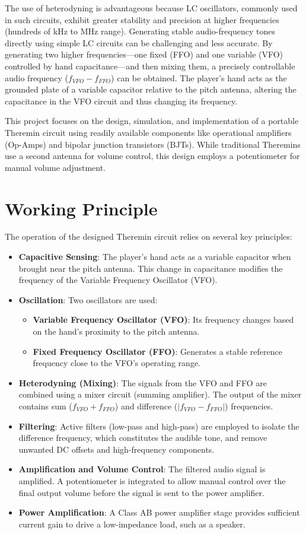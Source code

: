 \documentclass[conference]{IEEEtran}
\begin{document}
The use of heterodyning is advantageous because LC oscillators, commonly used in such circuits, exhibit greater stability and precision at higher frequencies (hundreds of kHz to MHz range). Generating stable audio-frequency tones directly using simple LC circuits can be challenging and less accurate. By generating two higher frequencies—one fixed (FFO) and one variable (VFO) controlled by hand capacitance—and then mixing them, a precisely controllable audio frequency ($f_{VFO} - f_{FFO}$) can be obtained. The player's hand acts as the grounded plate of a variable capacitor relative to the pitch antenna, altering the capacitance in the VFO circuit and thus changing its frequency.

This project focuses on the design, simulation, and implementation of a portable Theremin circuit using readily available components like operational amplifiers (Op-Amps) and bipolar junction transistors (BJTs). While traditional Theremins use a second antenna for volume control, this design employs a potentiometer for manual volume adjustment.

\section{Working Principle}
The operation of the designed Theremin circuit relies on several key principles:
\begin{itemize}
    \item \textbf{Capacitive Sensing}: The player's hand acts as a variable capacitor when brought near the pitch antenna. This change in capacitance modifies the frequency of the Variable Frequency Oscillator (VFO).
    \item \textbf{Oscillation}: Two oscillators are used:
        \begin{itemize}
            \item \textbf{Variable Frequency Oscillator (VFO)}: Its frequency changes based on the hand's proximity to the pitch antenna.
            \item \textbf{Fixed Frequency Oscillator (FFO)}: Generates a stable reference frequency close to the VFO's operating range.
        \end{itemize}
    \item \textbf{Heterodyning (Mixing)}: The signals from the VFO and FFO are combined using a mixer circuit (summing amplifier). The output of the mixer contains sum ($f_{VFO} + f_{FFO}$) and difference ($|f_{VFO} - f_{FFO}|$) frequencies.
    \item \textbf{Filtering}: Active filters (low-pass and high-pass) are employed to isolate the difference frequency, which constitutes the audible tone, and remove unwanted DC offsets and high-frequency components.
    \item \textbf{Amplification and Volume Control}: The filtered audio signal is amplified. A potentiometer is integrated to allow manual control over the final output volume before the signal is sent to the power amplifier.
    \item \textbf{Power Amplification}: A Class AB power amplifier stage provides sufficient current gain to drive a low-impedance load, such as a speaker.
\end{itemize}
\end{document}
